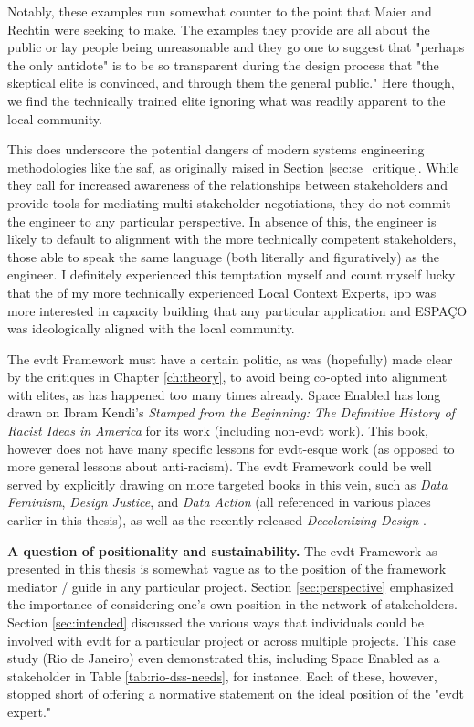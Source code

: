 Notably, these examples run somewhat counter to the point that Maier and Rechtin were seeking to make. The examples they provide are all about the public or lay people being unreasonable and they go one to suggest that "perhaps the only antidote" is to be so transparent during the design process that "the skeptical elite is convinced, and through them the general public." Here though, we find the technically trained elite ignoring what was readily apparent to the local community. 

This does underscore the potential dangers of modern systems engineering methodologies like the \ac{saf}, as originally raised in Section \ref{sec:se_critique}. While they call for increased awareness of the relationships between stakeholders and provide tools for mediating multi-stakeholder negotiations, they do not commit the engineer to any particular perspective. In absence of this, the engineer is likely to default to alignment with the more technically competent stakeholders, those able to speak the same language (both literally and figuratively) as the engineer. I definitely experienced this temptation myself and count myself lucky that the of my more technically experienced Local Context Experts, \ac{ipp} was more interested in capacity building that any particular application and ESPAÇO was ideologically aligned with the local community.

The \ac{evdt} Framework must have a certain politic, as was (hopefully) made clear by the critiques in Chapter \ref{ch:theory}, to avoid being co-opted into alignment with elites, as has happened too many times already. Space Enabled has long drawn on Ibram Kendi's \textit{Stamped from the Beginning: The Definitive History of Racist Ideas in America} for its work (including non-\ac{evdt} work). This book, however does not have many specific lessons for \ac{evdt}-esque work (as opposed to more general lessons about anti-racism). The \ac{evdt} Framework could be well served by explicitly drawing on more targeted books in this vein, such as \textit{Data Feminism}, \textit{Design Justice}, and \textit{Data Action} (all referenced in various places earlier in this thesis), as well as the recently released \textit{Decolonizing Design} \cite{tunstallDecolonizingDesignCultural2023}. 

\textbf{A question of positionality and sustainability.} The \ac{evdt} Framework as presented in this thesis is somewhat vague as to the position of the framework mediator / guide in any particular project. Section \ref{sec:perspective} emphasized the importance of considering one's own position in the network of stakeholders. Section \ref{sec:intended} discussed the various ways that individuals could be involved with \ac{evdt} for a particular project or across multiple projects. This case study (Rio de Janeiro) even demonstrated this, including Space Enabled as a stakeholder in Table \ref{tab:rio-dss-needs}, for instance. Each of these, however, stopped short of offering a normative statement on the ideal position of the "\ac{evdt} expert."

